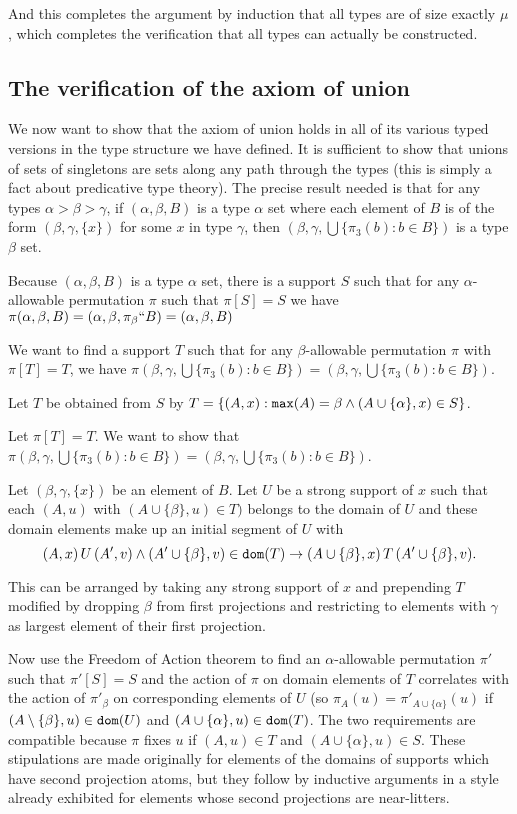 \documentclass[12pt]{article}
\begin{document}
And this completes the argument by induction that all types are of size exactly $\mu$, which completes the verification that all types can actually be constructed.

\subsection{The verification of the axiom of union}

We now want to show that the axiom of union holds in all of its various typed versions in the type structure we have defined.  It is sufficient to show that unions of sets of singletons are sets along any path through the types (this is simply a fact about predicative type theory).
The precise result needed is that for any types $\alpha>\beta>\gamma$, if $(\alpha,\beta,B)$ is a type $\alpha$ set where each element of $B$ is of the form $(\beta,\gamma,\{x\})$ for some $x$ in type $\gamma$, then
$(\beta,\gamma,\bigcup\{\pi_3(b):b \in B\})$ is a type $\beta$ set.

Because $(\alpha,\beta,B)$ is a type $\alpha$ set, there is a support $S$ such that for any $\alpha$-allowable permutation $\pi$ such that $\pi[S]=S$ we have $\pi(\alpha,\beta,B) = (\alpha,\beta,\pi_\beta``B) = (\alpha,\beta,B)$

We want to find a support $T$ such that for any $\beta$-allowable permutation $\pi$ with $\pi[T]=T$, we have $\pi(\beta,\gamma,\bigcup\{\pi_3(b):b \in B\})=(\beta,\gamma,\bigcup\{\pi_3(b):b \in B\})$.

Let $T$ be obtained from $S$ by $T = \{(A,x):  {\tt max}(A) = \beta \wedge (A \cup \{\alpha\},x) \in S\}$.

Let $\pi[T]=T$.  We want to show that $\pi(\beta,\gamma,\bigcup\{\pi_3(b):b \in B\})=(\beta,\gamma,\bigcup\{\pi_3(b):b \in B\})$.

Let $(\beta,\gamma,\{x\})$ be an element of $B$.  Let $U$ be a strong support of $x$ such that each $(A,u)$ with $(A \cup \{\beta\},u) \in T)$ belongs to the domain of $U$ and these domain elements make up an initial segment of $U$ with $$(A,x) \, U \, (A',v) \wedge (A' \cup \{\beta\},v) \in {\tt dom}(T) \rightarrow (A\cup \{\beta\},x) \, T \, (A'\cup \{\beta\},v).$$

This can be arranged by taking any strong support of $x$ and prepending $T$ modified by dropping $\beta$ from first projections and restricting to elements with $\gamma$ as largest element of their first projection.

Now use the Freedom of Action theorem to find an $\alpha$-allowable permutation $\pi'$ such that $\pi'[S]=S$ and the action of $\pi$ on domain elements of $T$ correlates with the action of $\pi'_{\beta}$ on corresponding elements of $U$ (so 
$\pi_{A}(u) = \pi'_{A \cup \{\alpha\}}(u)$
 if $(A\setminus \{\beta\},u) \in {\tt dom}(U)$ and $(A \cup \{\alpha\},u) \in {\tt dom}(T)$.
The two requirements are compatible because $\pi$ fixes $u$ if $(A,u) \in T$ and $(A \cup \{\alpha\},u) \in S$.  These stipulations are made originally for elements of the domains of supports which have second projection atoms, but they follow by inductive arguments in a style already exhibited for elements whose second projections are near-litters.
\end{document}
